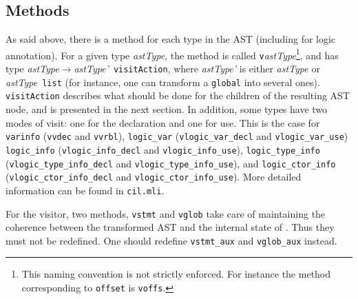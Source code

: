 \subsection{Methods}\label{adv:sec:methods}

As said above, there is a method for each type in the \cil AST
(including for logic annotation). For a given type
\emph{astType}, the method is called \texttt{v}\emph{astType}\footnote{This
  naming convention is not strictly enforced. For instance the method
  corresponding to \texttt{offset} is
  \texttt{voffs}.}, and has type
\mbox{\emph{astType}$\rightarrow$\emph{astType'}~\texttt{visitAction}}, where
\emph{astType'} is either \emph{astType} or \emph{astType}~\texttt{list} (for
instance, one can transform a \verb+global+ into
several ones). \texttt{visitAction} describes
what should be done for the children of the resulting AST node, and is
presented in the next section. In addition, some types have two modes
of visit: one for the declaration and one for use. This is the case for
\verb+varinfo+
(\verb+vvdec+ and
\verb+vvrbl+),
\verb+logic_var+
(\verb+vlogic_var_decl+ and
\verb+vlogic_var_use+)
\verb+logic_info+
(\verb+vlogic_info_decl+ and
\verb+vlogic_info_use+),
\verb+logic_type_info+
(\verb+vlogic_type_info_decl+ and
\verb+vlogic_type_info_use+), and
\verb+logic_ctor_info+
(\verb+vlogic_ctor_info_decl+ and
\verb+vlogic_ctor_info_use+).
More detailed information can be found in \verb+cil.mli+.

\begin{important}
  For the \framac visitor, two methods,
  \verb+vstmt+
  and \verb+vglob+ take
  care of maintaining the coherence between the transformed
  AST and the internal state of \framac%
  . Thus they must not be redefined. One should redefine
  \verb+vstmt_aux+ and
  \verb+vglob_aux+ instead.
\end{important}

